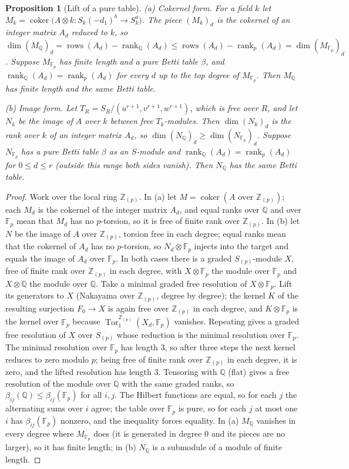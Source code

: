 \documentclass[11pt]{article}
\newtheorem{proposition}{Proposition}
\theoremstyle{definition}
\theoremstyle{remark}
\newcommand{\Q}{\mathbb{Q}}
\newcommand{\F}{\mathbb{F}}
\newcommand{\Z}{\mathbb{Z}}
\newcommand{\Tor}{\operatorname{Tor}}
\begin{document}
\begin{proposition}[Lift of a pure table]\label{prop:lift}
\emph{(a) Cokernel form.} For a field $k$ let $M_k=\operatorname{coker}\big(A\otimes k:S_k(-d_1)^b\to S_k^a\big)$. The piece $(M_k)_d$ is the cokernel of an integer matrix $A_d$ reduced to $k$, so $\dim(M_\Q)_d=\operatorname{rows}(A_d)-\operatorname{rank}_\Q(A_d)\le\operatorname{rows}(A_d)-\operatorname{rank}_p(A_d)=\dim(M_{\F_p})_d$. Suppose $M_{\F_p}$ has finite length and a pure Betti table $\beta$, and $\operatorname{rank}_\Q(A_d)=\operatorname{rank}_p(A_d)$ for every $d$ up to the top degree of $M_{\F_p}$. Then $M_\Q$ has finite length and the same Betti table.

\emph{(b) Image form.} Let $T_R=S_R/(u^{r+1},v^{r+1},w^{r+1})$, which is free over $R$, and let $N_k$ be the image of $A$ over $k$ between free $T_k$-modules. Then $\dim(N_k)_d$ is the rank over $k$ of an integer matrix $A_d$, so $\dim(N_\Q)_d\ge\dim(N_{\F_p})_d$. Suppose $N_{\F_p}$ has a pure Betti table $\beta$ as an $S$-module and $\operatorname{rank}_\Q(A_d)=\operatorname{rank}_p(A_d)$ for $0\le d\le r$ (outside this range both sides vanish). Then $N_\Q$ has the same Betti table.
\end{proposition}
\begin{proof}
Work over the local ring $\Z_{(p)}$. In (a) let $M=\operatorname{coker}(A\text{ over }\Z_{(p)})$; each $M_d$ is the cokernel of the integer matrix $A_d$, and equal ranks over $\Q$ and over $\F_p$ mean that $M_d$ has no $p$-torsion, so it is free of finite rank over $\Z_{(p)}$. In (b) let $N$ be the image of $A$ over $\Z_{(p)}$, torsion free in each degree; equal ranks mean that the cokernel of $A_d$ has no $p$-torsion, so $N_d\otimes\F_p$ injects into the target and equals the image of $A_d$ over $\F_p$. In both cases there is a graded $S_{(p)}$-module $X$, free of finite rank over $\Z_{(p)}$ in each degree, with $X\otimes\F_p$ the module over $\F_p$ and $X\otimes\Q$ the module over $\Q$. Take a minimal graded free resolution of $X\otimes\F_p$. Lift its generators to $X$ (Nakayama over $\Z_{(p)}$, degree by degree); the kernel $K$ of the resulting surjection $F_0\to X$ is again free over $\Z_{(p)}$ in each degree, and $K\otimes\F_p$ is the kernel over $\F_p$ because $\Tor_1^{\Z_{(p)}}(X_d,\F_p)$ vanishes. Repeating gives a graded free resolution of $X$ over $S_{(p)}$ whose reduction is the minimal resolution over $\F_p$. The minimal resolution over $\F_p$ has length $3$, so after three steps the next kernel reduces to zero modulo $p$; being free of finite rank over $\Z_{(p)}$ in each degree, it is zero, and the lifted resolution has length $3$. Tensoring with $\Q$ (flat) gives a free resolution of the module over $\Q$ with the same graded ranks, so $\beta_{ij}(\Q)\le\beta_{ij}(\F_p)$ for all $i,j$. The Hilbert functions are equal, so for each $j$ the alternating sums over $i$ agree; the table over $\F_p$ is pure, so for each $j$ at most one $i$ has $\beta_{ij}(\F_p)$ nonzero, and the inequality forces equality. In (a) $M_\Q$ vanishes in every degree where $M_{\F_p}$ does (it is generated in degree $0$ and its pieces are no larger), so it has finite length; in (b) $N_\Q$ is a submodule of a module of finite length.
\end{proof}
\end{document}
